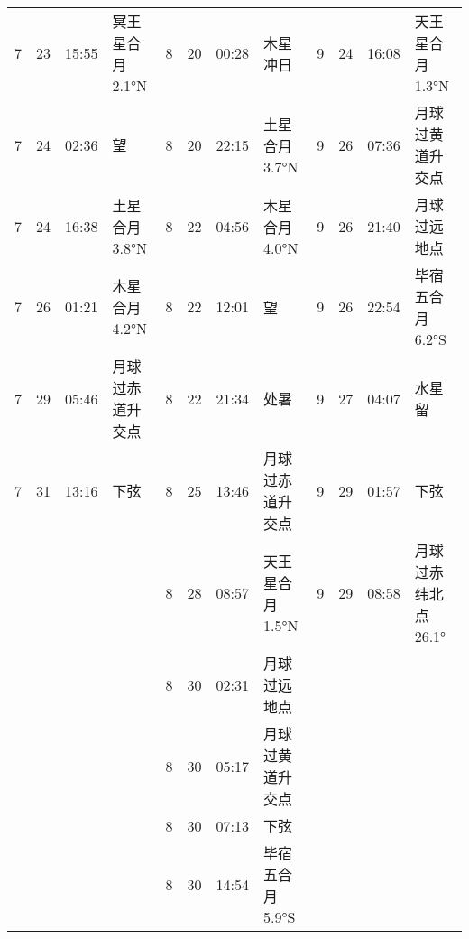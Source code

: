 \begin{tabular}{llll|llll|llll}
7 & 23 & 15:55 & 冥王星合月 2.1°N & 8 & 20 & 00:28 & 木星冲日 & 9 & 24 & 16:08 & 天王星合月 1.3°N \tabularnewline
7 & 24 & 02:36 & 望 & 8 & 20 & 22:15 & 土星合月 3.7°N & 9 & 26 & 07:36 & 月球过黄道升交点 \tabularnewline
7 & 24 & 16:38 & 土星合月 3.8°N & 8 & 22 & 04:56 & 木星合月 4.0°N & 9 & 26 & 21:40 & 月球过远地点 \tabularnewline
7 & 26 & 01:21 & 木星合月 4.2°N & 8 & 22 & 12:01 & 望 & 9 & 26 & 22:54 & 毕宿五合月 6.2°S \tabularnewline
7 & 29 & 05:46 & 月球过赤道升交点 & 8 & 22 & 21:34 & 处暑 & 9 & 27 & 04:07 & 水星留 \tabularnewline
7 & 31 & 13:16 & 下弦 & 8 & 25 & 13:46 & 月球过赤道升交点 & 9 & 29 & 01:57 & 下弦 \tabularnewline
 &  &  &  & 8 & 28 & 08:57 & 天王星合月 1.5°N & 9 & 29 & 08:58 & 月球过赤纬北点 26.1° \tabularnewline
 &  &  &  & 8 & 30 & 02:31 & 月球过远地点 &  &  &  &  \tabularnewline
 &  &  &  & 8 & 30 & 05:17 & 月球过黄道升交点 &  &  &  &  \tabularnewline
 &  &  &  & 8 & 30 & 07:13 & 下弦 &  &  &  &  \tabularnewline
 &  &  &  & 8 & 30 & 14:54 & 毕宿五合月 5.9°S &  &  &  &  \tabularnewline
\hline \end{tabular}

